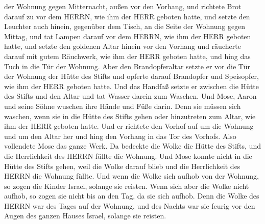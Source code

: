 der Wohnung gegen Mitternacht, außen vor den Vorhang,  und
richtete Brot darauf zu vor dem HERRN, wie ihm der HERR geboten hatte,
 und setzte den Leuchter auch hinein, gegenüber dem Tisch,
an die Seite der Wohnung gegen Mittag,  und tat Lampen
darauf vor dem HERRN, wie ihm der HERR geboten hatte,  und
setzte den goldenen Altar hinein vor den Vorhang  und
räucherte darauf mit gutem Räuchwerk, wie ihm der HERR geboten hatte,
 und hing das Tuch in die Tür der Wohnung. 
Aber den Brandopferaltar setzte er vor die Tür der Wohnung der Hütte des
Stifts und opferte darauf Brandopfer und Speisopfer, wie ihm der HERR
geboten hatte.  Und das Handfaß setzte er zwischen die
Hütte des Stifts und den Altar und tat Wasser darein zum Waschen.
 Und Mose, Aaron und seine Söhne wuschen ihre Hände und
Füße darin.  Denn sie müssen sich waschen, wenn sie in die
Hütte des Stifts gehen oder hinzutreten zum Altar, wie ihm der HERR
geboten hatte.  Und er richtete den Vorhof auf um die
Wohnung und um den Altar her und hing den Vorhang in das Tor des
Vorhofs. Also vollendete Mose das ganze Werk.  Da bedeckte
die Wolke die Hütte des Stifts, und die Herrlichkeit des HERRN füllte
die Wohnung.  Und Mose konnte nicht in die Hütte des Stifts
gehen, weil die Wolke darauf blieb und die Herrlichkeit des HERRN die
Wohnung füllte.  Und wenn die Wolke sich aufhob von der
Wohnung, so zogen die Kinder Israel, solange sie reisten. 
Wenn sich aber die Wolke nicht aufhob, so zogen sie nicht bis an den
Tag, da sie sich aufhob.  Denn die Wolke des HERRN war des
Tages auf der Wohnung, und des Nachts war sie feurig vor den Augen des
ganzen Hauses Israel, solange sie reisten.
